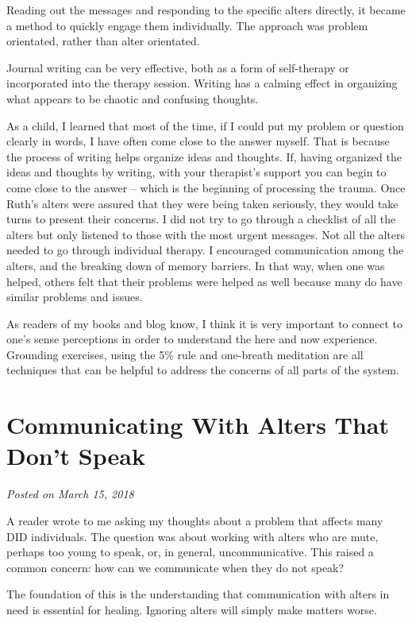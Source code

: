 \documentclass[]{book}
\begin{document}
Reading out the messages and responding to the specific alters directly, it became a method to quickly engage them individually. The approach was problem orientated, rather than alter orientated.

Journal writing can be very effective, both as a form of self-therapy or incorporated into the therapy session. Writing has a calming effect in organizing what appears to be chaotic and confusing thoughts.

As a child, I learned that most of the time, if I could put my problem or question clearly in words, I have often come close to the answer myself. That is because the process of writing helps organize ideas and thoughts. If, having organized the ideas and thoughts by writing, with your therapist's support you can begin to come close to the answer -- which is the beginning of processing the trauma. Once Ruth's alters were assured that they were being taken seriously, they would take turns to present their concerns. I did not try to go through a checklist of all the alters but only listened to those with the most urgent messages. Not all the alters needed to go through individual therapy. I encouraged communication among the alters, and the breaking down of memory barriers. In that way, when one was helped, others felt that their problems were helped as well because many do have similar problems and issues.

As readers of my books and blog know, I think it is very important to connect to one's sense perceptions in order to understand the here and now experience. Grounding exercises, using the 5\% rule and one-breath meditation are all techniques that can be helpful to address the concerns of all parts of the system.

\hypertarget{communicating-with-alters-that-dont-speak}{%
\section{Communicating With Alters That Don't Speak}\label{communicating-with-alters-that-dont-speak}}

\emph{Posted on March 15, 2018}

A reader wrote to me asking my thoughts about a problem that affects many DID individuals. The question was about working with alters who are mute, perhaps too young to speak, or, in general, uncommunicative. This raised a common concern: how can we communicate when they do not speak?

The foundation of this is the understanding that communication with alters in need is essential for healing. Ignoring alters will simply make matters worse.
\end{document}
